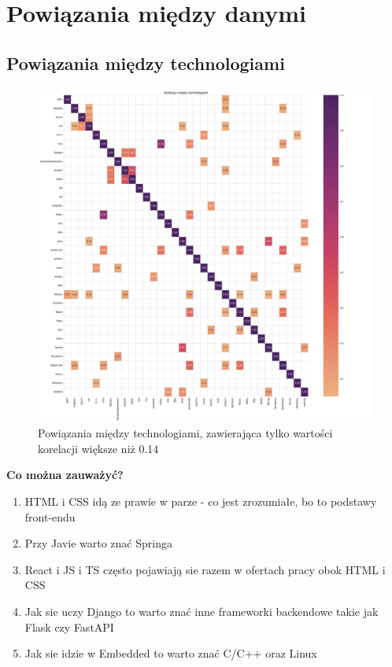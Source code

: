 \documentclass[a4paper]{article}
\begin{document}
\section{Powiązania między danymi}

\subsection{Powiązania między technologiami}

\begin{figure}[H]
    \centering
    \includegraphics[width=\textwidth]{../analysis/plots/korelacje/korelacja_między_technologiami.png}
    \caption{Powiązania między technologiami, zawierająca tylko wartości korelacji większe niż 0.14}
\end{figure}

\quad \textbf{Co można zauważyć?}

\begin{enumerate}
    \item HTML i CSS idą ze prawie w parze - co jest zrozumiałe, bo to podstawy front-endu
    \item Przy Javie warto znać Springa
    \item React i JS i TS często pojawiają sie razem w ofertach pracy obok HTML i CSS
    \item Jak sie uczy Django to warto znać inne frameworki backendowe takie jak Flask czy FastAPI
    \item Jak sie idzie w Embedded to warto znać C/C++ oraz Linux
\end{enumerate}
\end{document}
